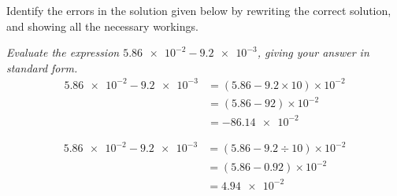 \documentclass[12pt,answers]{exam}
\begin{document}
\begin{questions}
\question Identify the errors in the solution given below by rewriting the correct solution,
and showing all the necessary workings.

\textit{Evaluate the expression $\num{5.86e-2}-\num{9.2e-3}$, giving your answer in standard form.}
\begin{align*}
	\num{5.86e-2}-\num{9.2e-3} &= (5.86-9.2\times10)\times10^{-2} \\
	&= (5.86-92)\times10^{-2} \\
	&= \num{-86.14e-2}
\end{align*}

\begin{solution}
\begin{align*}
	\num{5.86e-2}-\num{9.2e-3} &= (5.86 - 9.2 \div 10) \times 10^{-2} \\
	&= (5.86 - 0.92) \times 10^{-2} \\
	&= \num{4.94e-2}
\end{align*}
\end{solution}
\end{questions}
\end{document}
